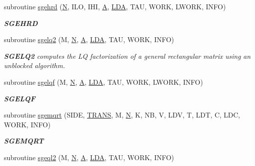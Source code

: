 \begin{DoxyCompactItemize}
subroutine \hyperlink{group__realGEcomputational_ga971828f964b9d15b72ea12b3d8321d88}{sgehrd} (\hyperlink{polmisc_8c_a0240ac851181b84ac374872dc5434ee4}{N}, I\+L\+O, I\+H\+I, \hyperlink{classA}{A}, \hyperlink{example__user_8c_ae946da542ce0db94dced19b2ecefd1aa}{L\+D\+A}, T\+A\+U, W\+O\+R\+K, L\+W\+O\+R\+K, I\+N\+F\+O)
\begin{DoxyCompactList}\small\item\em {\bfseries S\+G\+E\+H\+R\+D} \end{DoxyCompactList}\item 
subroutine \hyperlink{group__realGEcomputational_ga1e2c1e289965eabae7fb4a1bd78aed2c}{sgelq2} (M, \hyperlink{polmisc_8c_a0240ac851181b84ac374872dc5434ee4}{N}, \hyperlink{classA}{A}, \hyperlink{example__user_8c_ae946da542ce0db94dced19b2ecefd1aa}{L\+D\+A}, T\+A\+U, W\+O\+R\+K, I\+N\+F\+O)
\begin{DoxyCompactList}\small\item\em {\bfseries S\+G\+E\+L\+Q2} computes the L\+Q factorization of a general rectangular matrix using an unblocked algorithm. \end{DoxyCompactList}\item 
subroutine \hyperlink{group__realGEcomputational_gaff7dd464bee9a9ace7e576e4ecca33c0}{sgelqf} (M, \hyperlink{polmisc_8c_a0240ac851181b84ac374872dc5434ee4}{N}, \hyperlink{classA}{A}, \hyperlink{example__user_8c_ae946da542ce0db94dced19b2ecefd1aa}{L\+D\+A}, T\+A\+U, W\+O\+R\+K, L\+W\+O\+R\+K, I\+N\+F\+O)
\begin{DoxyCompactList}\small\item\em {\bfseries S\+G\+E\+L\+Q\+F} \end{DoxyCompactList}\item 
subroutine \hyperlink{group__realGEcomputational_ga867bbfcb127db8f51ef22f7b29089ca7}{sgemqrt} (S\+I\+D\+E, \hyperlink{superlu__enum__consts_8h_a0c4e17b2d5cea33f9991ccc6a6678d62a1f61e3015bfe0f0c2c3fda4c5a0cdf58}{T\+R\+A\+N\+S}, M, \hyperlink{polmisc_8c_a0240ac851181b84ac374872dc5434ee4}{N}, K, N\+B, V, L\+D\+V, T, L\+D\+T, C, L\+D\+C, W\+O\+R\+K, I\+N\+F\+O)
\begin{DoxyCompactList}\small\item\em {\bfseries S\+G\+E\+M\+Q\+R\+T} \end{DoxyCompactList}\item 
subroutine \hyperlink{group__realGEcomputational_ga242e34c6d75598ab3fdac21565a81099}{sgeql2} (M, \hyperlink{polmisc_8c_a0240ac851181b84ac374872dc5434ee4}{N}, \hyperlink{classA}{A}, \hyperlink{example__user_8c_ae946da542ce0db94dced19b2ecefd1aa}{L\+D\+A}, T\+A\+U, W\+O\+R\+K, I\+N\+F\+O)

\end{DoxyCompactItemize}
